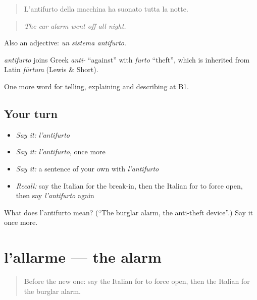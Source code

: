 \begin{quote}
L'antifurto della macchina ha suonato tutta la notte.
\end{quote}

\begin{quote}
\emph{The car alarm went off all night.}
\end{quote}

Also an adjective: \emph{un sistema antifurto}.

\begin{cousinweb}
\emph{antifurto} joins Greek \emph{anti-} \textquotedblleft{}against\textquotedblright{} with \emph{furto} \textquotedblleft{}theft\textquotedblright{}, which is inherited from Latin \emph{fūrtum} (Lewis \& Short).
\end{cousinweb}

\begin{grammarlens}[title={What you've built}]
One more word for telling, explaining and describing at B1.
\end{grammarlens}

\subsection*{Your turn}
\begin{itemize}
\raggedright
  \item \emph{Say it:} \emph{l'antifurto}
  \item \emph{Say it:} \emph{l'antifurto}, once more
  \item \emph{Say it:} a sentence of your own with \emph{l'antifurto}
  \item \emph{Recall:} say the Italian for the break-in, then the Italian for to force open, then say \emph{l'antifurto} again
\end{itemize}

\begin{tcolorbox}[breakable,colback=teal!4,colframe=teal!35!black,title={Before you move on}]
What does l'antifurto mean? (\textquotedblleft{}The burglar alarm, the anti-theft device\textquotedblright{}.) Say it once more.
\end{tcolorbox}
\section[l'allarme]{l'allarme — the alarm}

\label{lesson:IT-C293-allarme}



\begin{quote}
Before the new one: say the Italian for to force open, then the Italian for the burglar alarm.
\end{quote}

